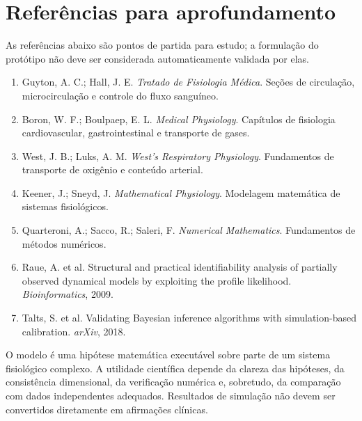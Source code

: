 \documentclass[11pt,a4paper,oneside]{book}
\begin{document}
\backmatter
\chapter*{Referências para aprofundamento}
As referências abaixo são pontos de partida para estudo; a formulação do protótipo não deve ser considerada automaticamente validada por elas.
\begin{enumerate}
  \item Guyton, A. C.; Hall, J. E. \textit{Tratado de Fisiologia Médica}. Seções de circulação, microcirculação e controle do fluxo sanguíneo.
  \item Boron, W. F.; Boulpaep, E. L. \textit{Medical Physiology}. Capítulos de fisiologia cardiovascular, gastrointestinal e transporte de gases.
  \item West, J. B.; Luks, A. M. \textit{West's Respiratory Physiology}. Fundamentos de transporte de oxigênio e conteúdo arterial.
  \item Keener, J.; Sneyd, J. \textit{Mathematical Physiology}. Modelagem matemática de sistemas fisiológicos.
  \item Quarteroni, A.; Sacco, R.; Saleri, F. \textit{Numerical Mathematics}. Fundamentos de métodos numéricos.
  \item Raue, A. et al. Structural and practical identifiability analysis of partially observed dynamical models by exploiting the profile likelihood. \textit{Bioinformatics}, 2009.
  \item Talts, S. et al. Validating Bayesian inference algorithms with simulation-based calibration. \textit{arXiv}, 2018.
\end{enumerate}

\begin{tcolorbox}[colback=red!2,colframe=red!45!black,title=Nota final]
O modelo é uma hipótese matemática executável sobre parte de um sistema fisiológico complexo. A utilidade científica depende da clareza das hipóteses, da consistência dimensional, da verificação numérica e, sobretudo, da comparação com dados independentes adequados. Resultados de simulação não devem ser convertidos diretamente em afirmações clínicas.
\end{tcolorbox}
\end{document}
